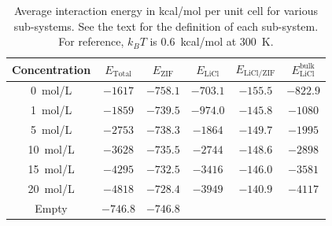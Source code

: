 \documentclass[thesis]{subfiles}
\begin{document}
\begin{table}[ht]
    \caption{Average interaction energy in kcal/mol per unit cell for various
    sub-systems. See the text for the definition of each sub-system.
    For reference, $k_BT$ is \SI{0.6}{kcal/mol} at \SI{300}{K}.}
    \label{table:thermo:raw}
    \centering
    \renewcommand{\arraystretch}{1.1}
    \begin{tabular}{c c c c c c}
        \toprule
        Concentration  & $E_\text{Total}$ & $E_\text{ZIF}$ & $E_\text{LiCl}$ & $E_\text{LiCl/ZIF}$ & $E_\text{LiCl}^\text{bulk}$ \\
        \midrule
        \SI{0}{mol/L}  &     $-1617$        &    $-758.1$      &   $-703.1$        &     $-155.5$           &   $-822.9$    \\
        \SI{1}{mol/L}  &     $-1859$        &    $-739.5$      &   $-974.0$        &     $-145.8$          &   $-1080$     \\
        \SI{5}{mol/L}  &     $-2753$        &    $-738.3$      &   $-1864$         &     $-149.7$           &   $-1995$     \\
        \SI{10}{mol/L} &     $-3628$        &    $-735.5$      &   $-2744$         &     $-148.6$           &   $-2898$     \\
        \SI{15}{mol/L} &     $-4295$        &    $-732.5$      &   $-3416$         &     $-146.0$           &   $-3581$     \\
        \SI{20}{mol/L} &     $-4818$        &    $-728.4$      &   $-3949$         &     $-140.9$           &   $-4117$     \\
        \bottomrule
        Empty          &     $-746.8$       &    $-746.8$      &                 &                      &             \\
        \bottomrule
    \end{tabular}
\end{table}
\end{document}

